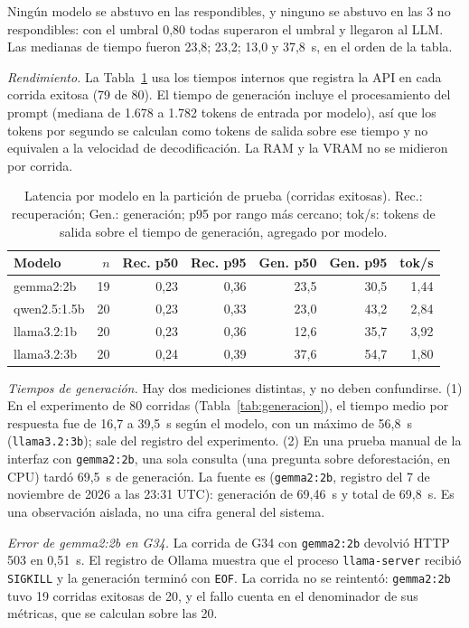\documentclass[conference]{IEEEtran}
\begin{document}
Ningún modelo se abstuvo en las respondibles, y ninguno se abstuvo en las 3 no respondibles: con el umbral 0,80 todas superaron el umbral y llegaron al LLM. Las medianas de tiempo fueron 23,8; 23,2; 13,0 y 37,8~s, en el orden de la tabla.

\textit{Rendimiento.} La Tabla~\ref{tab:rendimiento} usa los tiempos internos que registra la API en cada corrida exitosa (79 de 80). El tiempo de generación incluye el procesamiento del prompt (mediana de 1.678 a 1.782 tokens de entrada por modelo), así que los tokens por segundo se calculan como tokens de salida sobre ese tiempo y no equivalen a la velocidad de decodificación. La RAM y la VRAM no se midieron por corrida.

\begin{table}[ht]
\centering
\caption{Latencia por modelo en la partición de prueba (corridas exitosas). Rec.: recuperación; Gen.: generación; p95 por rango más cercano; tok/s: tokens de salida sobre el tiempo de generación, agregado por modelo.}
\label{tab:rendimiento}
\setlength{\tabcolsep}{3pt}
\small
\begin{tabular}{lrrrrrr}
\toprule
Modelo & $n$ & Rec. p50 & Rec. p95 & Gen. p50 & Gen. p95 & tok/s \\
\midrule
gemma2:2b & 19 & 0,23 & 0,36 & 23,5 & 30,5 & 1,44 \\
qwen2.5:1.5b & 20 & 0,23 & 0,33 & 23,0 & 43,2 & 2,84 \\
llama3.2:1b & 20 & 0,23 & 0,36 & 12,6 & 35,7 & 3,92 \\
llama3.2:3b & 20 & 0,24 & 0,39 & 37,6 & 54,7 & 1,80 \\
\bottomrule
\end{tabular}
\end{table}

\textit{Tiempos de generación.} Hay dos mediciones distintas, y no deben confundirse. (1) En el experimento de 80 corridas (Tabla~\ref{tab:generacion}), el tiempo medio por respuesta fue de 16,7 a 39,5~s según el modelo, con un máximo de 56,8~s (\texttt{llama3.2:3b}); sale del registro del experimento. (2) En una prueba manual de la interfaz con \texttt{gemma2:2b}, una sola consulta (una pregunta sobre deforestación, en CPU) tardó 69,5~s de generación. La fuente es  (\texttt{gemma2:2b}, registro del 7 de noviembre de 2026 a las 23:31 UTC): generación de 69,46~s y total de 69,8~s. Es una observación aislada, no una cifra general del sistema.

\textit{Error de gemma2:2b en G34.} La corrida de G34 con \texttt{gemma2:2b} devolvió HTTP 503 en 0,51~s. El registro de Ollama muestra que el proceso \texttt{llama-server} recibió \texttt{SIGKILL} y la generación terminó con \texttt{EOF}. La corrida no se reintentó: \texttt{gemma2:2b} tuvo 19 corridas exitosas de 20, y el fallo cuenta en el denominador de sus métricas, que se calculan sobre las 20.
\end{document}
